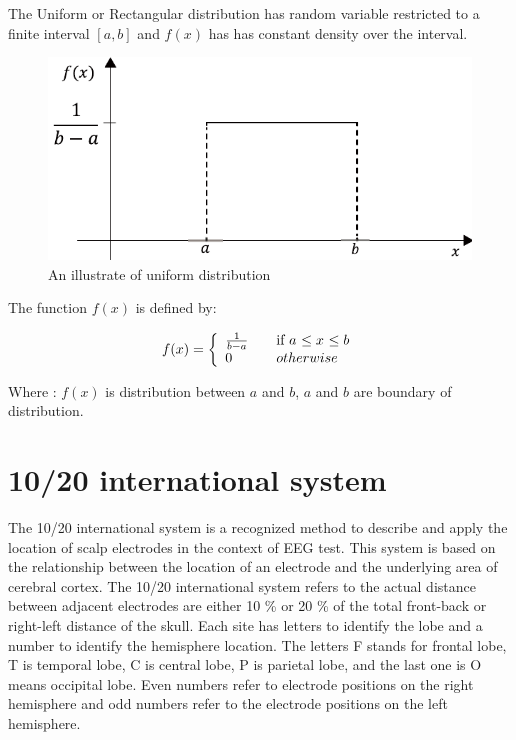 \hspace{1.5cm} The Uniform or Rectangular distribution has random variable  restricted to a finite interval $[a,b]$ and $f(x)$ has  has constant density over the interval.

\begin{figure}[ht]
	\centering
	\includegraphics[scale = 0.8]{chapter3/34.pdf}
	\caption{An illustrate of uniform distribution}
\end{figure}

The function $f(x)$ is defined by:

\begin{equation}\label{2}
f(x) = \left\{ 
\begin{array}{l l}
  {1 \over b-a} & \quad \mbox{if $a$ $\leq x$ $\leq b$}\\
  0 & \quad \mbox{$otherwise$}\\ \end{array} \right.
\end{equation}

Where : $f(x)$ is distribution between $a$ and $b$, $a$ and $b$ are boundary of distribution.

\section{10/20 international system}
\hspace{1.5cm} The 10/20 international system is a recognized method to describe and apply the location of scalp electrodes in the context of EEG test. This system is based on the relationship between the location of an electrode and the underlying area of cerebral cortex. The 10/20 international system refers to the actual distance between adjacent electrodes are either 10 \% or 20 \% of the total front-back or right-left distance of the skull. Each site has letters to identify the lobe and a number to identify the hemisphere location. The letters F stands for frontal lobe, T is temporal lobe, C is central lobe, P is parietal lobe, and the last one is O means occipital lobe. Even numbers refer to electrode positions on the right hemisphere and odd numbers refer to the electrode positions on the left hemisphere.

